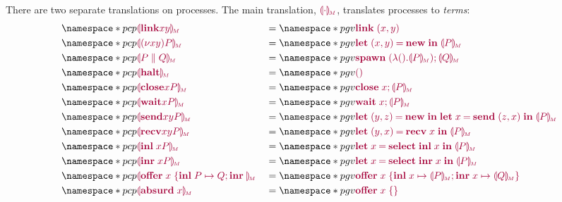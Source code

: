 There are two separate translations on processes. The main translation, $\tm{\cpgvM{\cdot}}$, translates processes to \emph{terms}:
\begin{align*}
  &\pcp{\tm{\cpgvM{\link{x}{y}}}}
  &&= \pgv{\tm{\link\;{\pair{x}{y}}}} \\
  &\pcp{\tm{\cpgvM{\res{x}{y}{P}}}}
  &&= \pgv{\tm{\letpair{x}{y}{\new}{\cpgvM{P}}}} \\
  &\pcp{\tm{\cpgvM{\ppar{P}{Q}}}}
  &&= \pgv{\tm{\andthen{\spawn\;{(\lambda\unit.\cpgvM{P})}}{\cpgvM{Q}}}} \\
  &\pcp{\tm{\cpgvM{\halt}}}
  &&= \pgv{\tm{\unit}} \\
  &\pcp{\tm{\cpgvM{\close{x}{P}}}}
  &&= \pgv{\tm{\andthen{\close\;{x}}{\cpgvM{P}}}} \\
  &\pcp{\tm{\cpgvM{\wait{x}{P}}}}
  &&= \pgv{\tm{\andthen{\wait\;{x}}{\cpgvM{P}}}} \\
  &\pcp{\tm{\cpgvM{\send{x}{y}{P}}}}
  &&= \pgv{\tm{\letpair{y}{z}{\new}{\letbind{x}{\send\;{\pair{z}{x}}}{\cpgvM{P}}}}} \\
  &\pcp{\tm{\cpgvM{\recv{x}{y}{P}}}}
  &&= \pgv{\tm{\letpair{y}{x}{\recv\;{x}}{\cpgvM{P}}}} \\
  &\pcp{\tm{\cpgvM{\inl{x}{P}}}}
  &&= \pgv{\tm{\letbind{x}{\select{\labinl}\;{x}}{\cpgvM{P}}}} \\
  &\pcp{\tm{\cpgvM{\inr{x}{P}}}}
  &&= \pgv{\tm{\letbind{x}{\select{\labinr}\;{x}}{\cpgvM{P}}}} \\
  &\pcp{\tm{\cpgvM{\offer{x}{P}{Q}}}}
  &&= \pgv{\tm{\offer{x}{x}{\cpgvM{P}}{x}{\cpgvM{Q}}}} \\
  &\pcp{\tm{\cpgvM{\absurd{x}}}}
  &&= \pgv{\tm{\offeremp{x}}}
\end{align*}

